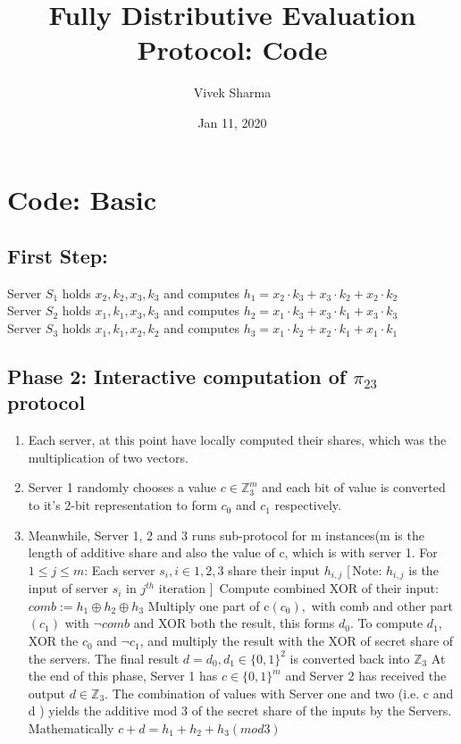 \documentclass[11pt]{article}
\title{Fully Distributive Evaluation Protocol: Code}
\author{Vivek Sharma}
\date{Jan 11, 2020}
\begin{document}
\maketitle


\section{Code: Basic}



\subsection{First Step:} 

Server $S_{1}$ holds $x_{2}, k_{2}, x_{3}, k_{3}$ and computes $h_{1} = x_{2} \cdot k_{3} + x_{3} \cdot k_{2} + x_{2} \cdot k_{2}$\\
Server $S_{2}$ holds $x_{1}, k_{1}, x_{3}, k_{3}$ and computes $h_{2} = x_{1} \cdot k_{3} + x_{3} \cdot k_{1} + x_{3} \cdot k_{3}$\\
Server $S_{3}$ holds $x_{1}, k_{1}, x_{2}, k_{2}$ and computes $h_{3} = x_{1} \cdot k_{2} + x_{2} \cdot k_{1} + x_{1} \cdot k_{1}$\\

\subsection{Phase 2: Interactive computation of $\pi_{23}$ protocol}

\begin{enumerate}
	\item Each server, at this point have locally computed their shares, which was the multiplication of two vectors.
	\item Server 1 randomly chooses a value $c \in \mathbb{Z}_{3}^{m}$ and each bit of value is converted to it's 2-bit representation to form $c_{0}$ and $c_{1}$ respectively. 
	\item Meanwhile, Server 1, 2 and 3 runs sub-protocol for m instances(m is the length of additive share and also the value of c, which is with server 1.
	\subitem For $1 \leq j \leq m$:
	\subitem Each server $s_{i} , i \in {1,2,3}$ share their input $h_{i,j}$ [\,Note: $h_{i,j}$ is the input of server $s_{i}$ in $j^{th}$ iteration ]\,
	\subitem Compute combined XOR of their input: $comb := h_{1} \oplus h_{2} \oplus h_{3}$
	\subitem Multiply one part of c$(c_{0}),$ with comb and other part $(c_{1})$ with $\neg{comb}$ and XOR both the result, this forms $d_{0}$.
	\subitem To compute $d_{1}$, XOR the $c_{0}$ and $\neg{c_{1}}$, and multiply the result with the XOR of secret share of the servers.
	\subitem The final result $d = d_{0}, d_{1} \in \{ 0,1\}^{2}$ is converted back into $\mathbb{Z}_{3}$
	\subitem At the end of this phase, Server 1 has $c \in \{0,1\}^m$ and Server 2 has received the output $d \in \mathbb{Z}_{3}$. The combination of values with Server one and two (i.e. c and d ) yields the additive mod 3 of the secret share of the inputs by the Servers. Mathematically $c + d = h_{1} + h_{2} + h_{3} (mod 3)$
\end{enumerate}
\end{document}
